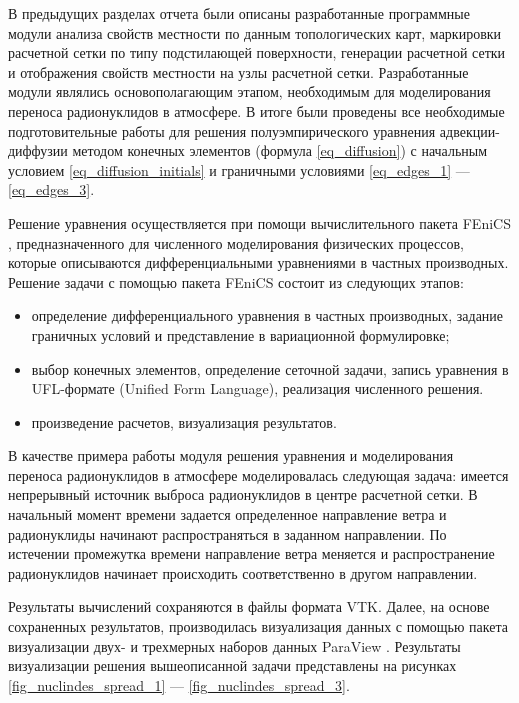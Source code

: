 В предыдущих разделах отчета были описаны разработанные программные модули анализа свойств местности по данным топологических 
карт, маркировки расчетной сетки по типу подстилающей поверхности, генерации расчетной сетки и отображения свойств 
местности на узлы расчетной сетки. Разработанные модули являлись основополагающим этапом, необходимым для моделирования 
переноса радионуклидов в атмосфере. В итоге были проведены все необходимые подготовительные работы для решения 
полуэмпирического уравнения адвекции-диффузии методом конечных элементов (формула \ref{eq_diffusion}) с начальным 
условием \ref{eq_diffusion_initials} и граничными условиями \ref{eq_edges_1} --- \ref{eq_edges_3}. 

Решение уравнения осуществляется при помощи вычислительного пакета FEniCS \cite{fenics_tut1}, предназначенного для 
численного моделирования физических процессов, которые описываются дифференциальными уравнениями в частных производных. 
Решение задачи с помощью пакета FEniCS состоит из следующих этапов:

\begin{itemize}
    \item определение дифференциального уравнения в частных производных, задание граничных условий и представление в 
        вариационной формулировке;
    \item выбор конечных элементов, определение сеточной задачи, запись уравнения в UFL-формате (Unified Form Language), 
        реализация численного решения.
    \item произведение расчетов, визуализация результатов.
\end{itemize}

В качестве примера работы модуля решения уравнения и моделирования переноса радионуклидов в атмосфере моделировалась 
следующая задача: имеется непрерывный источник выброса радионуклидов в центре расчетной сетки. В начальный момент 
времени задается определенное направление ветра и радионуклиды начинают распространяться в заданном направлении. По 
истечении промежутка времени направление ветра меняется и распространение радионуклидов начинает происходить 
соответственно в другом направлении.

Результаты вычислений сохраняются в файлы формата VTK. Далее, на основе сохраненных результатов, производилась 
визуализация данных с помощью пакета визуализации двух- и трехмерных наборов данных ParaView \cite{paraview}. 
Результаты визуализации решения вышеописанной задачи представлены на рисунках \ref{fig_nuclindes_spread_1} ---
\ref{fig_nuclindes_spread_3}.

